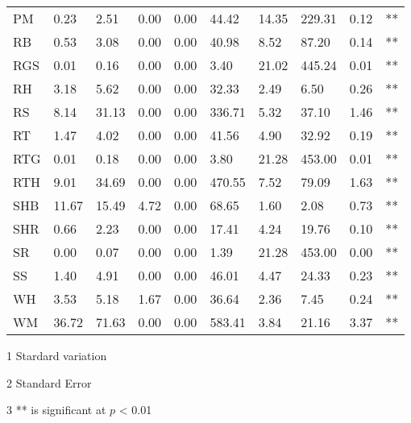 \begin{landscape}
\begin{table}[]
\begin{threeparttable}
\begin{tabular}{lllllllllc}
PM   & 0.23   & 2.51   & 0.00   & 0.00 & 44.42   & 14.35    & 229.31   & 0.12  & **               \\
RB   & 0.53   & 3.08   & 0.00   & 0.00 & 40.98   & 8.52     & 87.20    & 0.14  & **               \\
RGS  & 0.01   & 0.16   & 0.00   & 0.00 & 3.40    & 21.02    & 445.24   & 0.01  & **               \\
RH   & 3.18   & 5.62   & 0.00   & 0.00 & 32.33   & 2.49     & 6.50     & 0.26  & **               \\
RS   & 8.14   & 31.13  & 0.00   & 0.00 & 336.71  & 5.32     & 37.10    & 1.46  & **               \\
RT   & 1.47   & 4.02   & 0.00   & 0.00 & 41.56   & 4.90     & 32.92    & 0.19  & **               \\
RTG  & 0.01   & 0.18   & 0.00   & 0.00 & 3.80    & 21.28    & 453.00   & 0.01  & **               \\
RTH  & 9.01   & 34.69  & 0.00   & 0.00 & 470.55  & 7.52     & 79.09    & 1.63  & **               \\
SHB  & 11.67  & 15.49  & 4.72   & 0.00 & 68.65   & 1.60     & 2.08     & 0.73  & **               \\
SHR  & 0.66   & 2.23   & 0.00   & 0.00 & 17.41   & 4.24     & 19.76    & 0.10  & **               \\
SR   & 0.00   & 0.07   & 0.00   & 0.00 & 1.39    & 21.28    & 453.00   & 0.00  & **               \\
SS   & 1.40   & 4.91   & 0.00   & 0.00 & 46.01   & 4.47     & 24.33    & 0.23  & **               \\
WH   & 3.53   & 5.18   & 1.67   & 0.00 & 36.64   & 2.36     & 7.45     & 0.24  & **               \\
WM   & 36.72  & 71.63  & 0.00   & 0.00 & 583.41  & 3.84     & 21.16    & 3.37  & **               \\ 
\hline
\end{tabular}
\begin{tablenotes}
     \item[1]Stardard variation \\
     \item[2]Standard Error \\
     \item[3]** is significant at $p$ < 0.01
\end{tablenotes}
\end{threeparttable}
\end{table}
\end{landscape}
